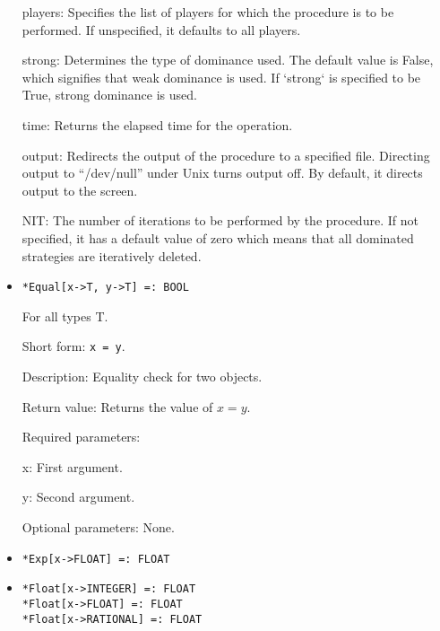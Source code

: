\begin{itemize}
\bd
\item
[players:] Specifies the list of players for which the procedure is to be
performed.  If unspecified, it defaults to all players.
\item
[strong:] Determines the type of dominance used.  The default value is
False, which signifies that weak dominance is used.  If `strong` is
specified to be True, strong dominance is used.
\item
[time:] Returns the elapsed time for the operation.
\item
[output:] Redirects the output of the procedure to a specified file.
Directing output to ``/dev/null'' under Unix turns output off.  By
default, it directs output to the screen.
\item
[NIT:] The number of iterations to be performed by the procedure.  If
not specified, it has a default value of zero which means that all
dominated strategies are iteratively deleted.
\ed
\ed


\item
\protect \large \begin{verbatim}
*Equal[x->T, y->T] =: BOOL
\end{verbatim}\normalsize

For all types T.

\bd
\item
[Short form:] \verb+x = y+.
\item
[Description:] Equality check for two objects.
\item
[Return value:] Returns the value of $x = y$.
\item
[Required parameters:]\hfil\null
	
\bd
\item
[x:] First argument.
\item
[y:] Second argument.
\ed

\item
[Optional parameters:] None.

\ed

\item
\protect \large \begin{verbatim}
*Exp[x->FLOAT] =: FLOAT
\end{verbatim} \normalsize



\item
\protect \large \begin{verbatim}
*Float[x->INTEGER] =: FLOAT
*Float[x->FLOAT] =: FLOAT
*Float[x->RATIONAL] =: FLOAT
\end{verbatim} \normalsize



\end{itemize}
